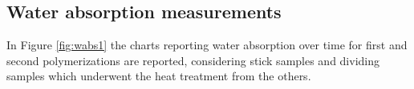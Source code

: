 \documentclass[a4paper, 11pt]{article}
\begin{document}
\subsection{Water absorption measurements}

In Figure \ref{fig:wabs1} the charts reporting water absorption over time for first and second polymerizations are reported, considering stick samples and dividing samples which underwent the heat treatment from the others. 
\begin{figure}[htp]
\centering
{} \quad 
\subfloat[][]

\end{figure}
\end{document}
